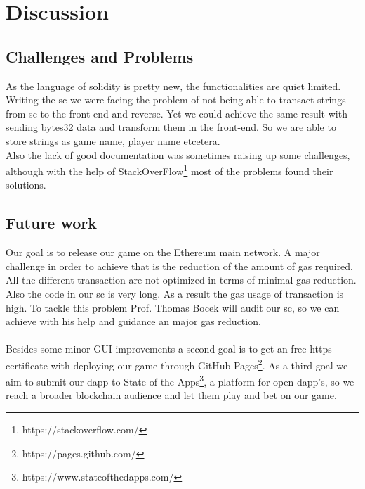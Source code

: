 \chapter{Discussion}\label{ch:discussion}
\section{Challenges and Problems}
As the language of solidity is pretty new, the functionalities are quiet limited. Writing the \ac{sc} we were facing the problem of not being able to transact strings from \ac{sc} to the front-end and reverse. Yet we could achieve the same result with sending bytes32 data and transform them in the front-end. So we are able to store strings as game name, player name etcetera.\\
Also the lack of good documentation was sometimes raising up some challenges, although with the help of StackOverFlow\footnote{https://stackoverflow.com/} most of the problems found their solutions.
\section{Future work}
\noindent Our goal is to release our game on the Ethereum main network. A major challenge in order to achieve that is the reduction of the amount of gas required. All the different transaction are not optimized in terms of minimal gas reduction. Also the code in our \ac{sc} is very long. As a result the gas usage of transaction is high.\newline
To tackle this problem Prof. Thomas Bocek will audit our \ac{sc}, so we can achieve with his help and guidance an major gas reduction.\\\\
Besides some minor GUI improvements a second goal is to get an free https certificate with deploying our game through GitHub Pages\footnote{https://pages.github.com/}.
As a third goal we aim to submit  our \ac{dapp} to State of the Apps\footnote{https://www.stateofthedapps.com/}, a platform for open \ac{dapp}'s, so we reach a broader blockchain audience and let them play and bet on our game.
